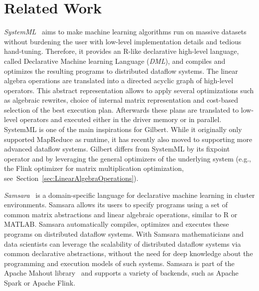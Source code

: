 \section{Related Work}
\label{sec:relatedWork}

{\em SystemML}~\cite{ghoting:2011a,Boehm2014,Boehm2014Hybrid,Schelter2015,Elgohary2016} aims to make machine learning algorithms run on massive datasets without burdening the user with low-level implementation details and tedious hand-tuning. 
Therefore, it provides an R-like declarative high-level language, called Declarative Machine learning Language (\emph{DML}), and compiles and optimizes the resulting programs to distributed dataflow systems. 
The linear algebra operations are translated into a directed acyclic graph of high-level operators. 
This abstract representation allows to apply several optimizations such as algebraic rewrites, choice of internal matrix representation and cost-based selection of the best execution plan. 
Afterwards these plans are translated to low-level operators and executed either in the driver memory or in parallel. 
SystemML is one of the main inspirations for Gilbert. 
While it originally only supported MapReduce as runtime, it has recently also moved to supporting more advanced dataflow systems. 
Gilbert differs from SystemML by its fixpoint operator and by leveraging the general optimizers of the underlying system (e.g., the Flink optimizer for matrix multiplication optimization, see~Section~\ref{sec:LinearAlgebraOperations}). 

{\em Samsara}~\cite{Lyubimov2016,Schelter2016} is a domain-specific language for declarative machine learning in cluster environments. 
Samsara allows its users to specify programs using a set of common matrix abstractions and linear algebraic operations, similar to R or MATLAB.
Samsara automatically compiles, optimizes and executes these programs on distributed dataflow systems. 
With Samsara mathematicians and data scientists can leverage the scalability of distributed dataflow systems via common declarative abstractions, without the need for deep knowledge about the programming and execution models of such systems. 
Samsara is part of the Apache Mahout library~\cite{mahout:2011a} and supports a variety of backends, such as Apache Spark or Apache Flink. 


